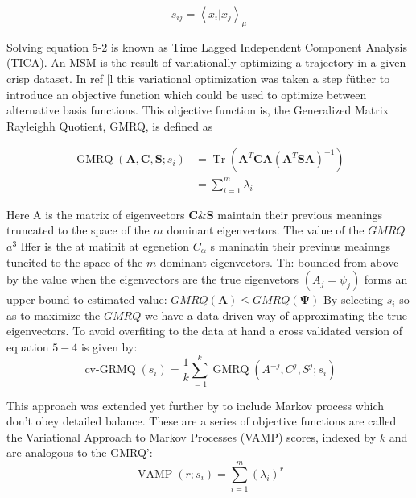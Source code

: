 \begin{equation}
s_{i j}=\left\langle x_{i} | x_{j}\right\rangle_{\mu}
\end{equation}

Solving equation 5-2 is known as Time Lagged Independent Component Analysis (TICA).
An MSM is the result of variationally optimizing a trajectory in a given crisp dataset. In ref $[\mathrm{l}$ this variational optimization was taken a step füther to introduce an objective function which could be used to optimize between alternative basis functions. This objective function is, the Generalized Matrix Rayleighh Quotient, GMRQ, is defined as

\begin{equation}
\begin{split}
\operatorname{GMRQ}\left(\mathbf{A}, \mathbf{C}, \mathbf{S} ; s_{i}\right) &=\operatorname{Tr}\left(\mathbf{A}^{T} \mathbf{C A}\left(\mathbf{A}^{T} \mathbf{S} \mathbf{A}\right)^{-1}\right) \\
&=\sum_{i=1}^{m} \lambda_{i}
\end{split}
\end{equation}

Here A is the matrix of eigenvectors $\mathbf{C} \& \mathbf{S}$ maintain their previous meanings truncated to the space of the $m$ dominant eigenvectors. The value of the $G M R Q$ $a^{3}$
Iffer is the at matinit at egenetion $C_{\alpha}$ s maninatin their previnus meainngs tuncited to the space of the $m$ dominant eigenvectors. Th: bounded from above by the value when the eigenvectors are the true eigenvetors $\left(A_{j}=\psi_{j}\right)$ forms an upper bound to estimated value:
$G M R Q(\mathbf{A}) \leq G M R Q(\boldsymbol{\Psi})$
By selecting $s_{i}$ so as to maximize the $G M R Q$ we have a data driven way of approximating the true eigenvectors. To avoid overfiting to the data at hand a cross validated version of equation $5-4$ is given by:
\begin{equation}
\operatorname{cv-GRMQ}(s_{i})=\frac{1}{k} \sum_{=1}^{k} \operatorname{GMRQ}\left(A^{-j}, C^{j}, S^{j} ; s_{i}\right)
\end{equation}

This approach was extended yet further by to include Markov process which don't obey detailed balance. These are a series of objective functions are called the Variational Approach to Markov Processes (VAMP) scores, indexed by $k$ and are analogous to the GMRQ':
\begin{equation}\label{eqn:def_vampr}
\operatorname{VAMP}(r ; s_{i})=\sum_{i=1}^{m}\left(\lambda_{i}\right)^{r}
\end{equation}

